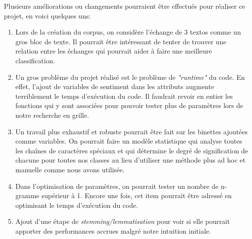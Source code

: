 Plusieurs améliorations ou changements pourraient être effectués pour réaliser ce projet, en voici quelques uns:

\begin{enumerate}
\item Lors de la création du corpus, on considère l'échange de 3 textos comme un gros bloc de texte. Il pourrait être intéressant de tenter de trouver une relation entre les échanges qui pourrait aider à faire une meilleure classification.

\item Un gros problème du projet réalisé est le problème de \emph{"runtime"} du code. En effet, l'ajout de variables de sentiment dans les attributs augmente terriblement le temps d'exécution du code. Il faudrait revoir en entier les fonctions qui y sont associées pour pouvoir tester plus de paramètres lors de notre recherche en grille.

\item Un travail plus exhaustif et robuste pourrait être fait sur les binettes ajoutées comme variables. On pourrait faire un modèle statistique qui analyse toutes les chaînes de caractères spéciaux et qui détermine le degré de signification de chacune pour toutes nos classes au lieu d'utiliser une méthode plus ad hoc et manuelle comme nous avons utilisée.

\item Dans l'optimisation de paramètres, on pourrait tester un nombre de n-gramme supérieur à 1. Encore une fois, cet item pourrait être adressé en optimisant le temps d'exécution du code.

\item Ajout d'une étape de \emph{stemming/lemmatisation} pour voir si elle pourrait apporter des performances accrues malgré notre intuition initiale.
\end{enumerate}